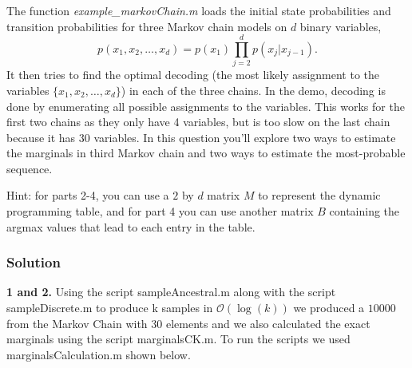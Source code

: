 \documentclass{article}
\begin{document}
The function \emph{example\_markovChain.m} loads the initial state probabilities and transition probabilities for three Markov chain models on $d$ binary variables,
\[
p(x_1,x_2,\dots,x_d) = p(x_1)\prod_{j=2}^{d}{p(x_j|x_{j-1})}.
\]
It then tries to find the optimal decoding (the most likely assignment to the variables $\{x_1,x_2,\dots,x_d\}$) in each of the three chains. In the demo, decoding is done by enumerating all possible assignments to the variables. This works for the first two chains as they only have 4 variables, but is too slow on the last chain because it has 30 variables. In this question you'll explore two ways to estimate the marginals in third Markov chain and two ways to estimate the most-probable sequence.

Hint: for parts 2-4, you can use a $2$ by $d$ matrix $M$ to represent the dynamic programming table, and for part 4 you can use another matrix $B$ containing the argmax values that lead to each entry in the table. 

\subsubsection*{Solution}
\textbf{1 and 2.}
\newline
Using the script sampleAncestral.m along with the script sampleDiscrete.m to produce k samples in $\mathcal{O}(\log(k))$ we produced a $10000$ from the 
Markov Chain with 30 elements and we also calculated the exact marginals using the script marginalsCK.m. To run the scripts we used marginalsCalculation.m
shown below.
\newline

\end{document}
